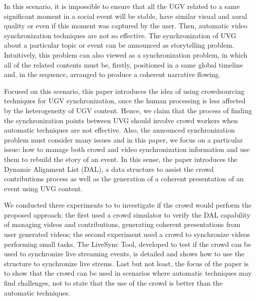 In this scenario, it is impossible to ensure that all the UGV related to a same significant moment in a social event will be stable, have similar visual and aural quality or even if this moment was captured by the user. Then, automatic video synchronization techniques are not so effective. The synchronization of UVG about a particular topic or event can be announced as storytelling problem. Intuitively, this problem can also viewed as a synchronization problem, in which all of the related contents must be, firstly, positioned in a same global timeline and, in the sequence, arranged to produce a coherent narrative flowing.

Focused on this scenario, this paper introduces the idea of using crowdsourcing techniques for UGV synchronization, once the human processing is less affected by the heterogeneity of UGV content. Hence, we claim that the process of finding the synchronization points between UVG should involve crowd workers when automatic techniques are not effective. Also, the announced synchronization problem must consider many issues and in this paper, we focus on a particular issue: how to manage both crowd and video synchronization information and use them to rebuild the story of an event. In this sense, the paper introduces the Dynamic Alignment List (DAL), a data structure to assist the crowd contributions process as well as the generation of a coherent presentation of an event using UVG content. 

We conducted three experiments to to investigate if the crowd would perform the proposed approach: the first used a crowd simulator to verify the DAL capability of managing videos and contributions, generating coherent presentations from user generated videos; the second experiment used a crowd to synchronize videos performing small tasks. The LiveSync Tool, developed to test if the crowd can be used to synchronize live streaming events, is detailed and shows how to use the structure to synchronize live strems. Last but not least, the focus of the paper is to show that the crowd can be used in scenarios where automatic techniques may find challenges, not to state that the use of the crowd is better than the automatic techniques.
